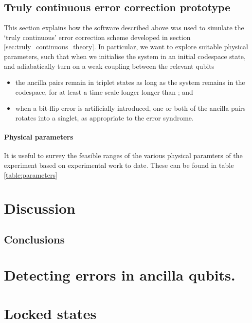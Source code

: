 \documentclass{report}
\begin{document}
\section{Truly continuous error correction prototype}
This section explains how the software described above was used to simulate the `truly continuous' error correction scheme developed in section \ref{sec:truly_continuous_theory}. In particular, we want to explore suitable physical parameters, such that when we initialise the system in an initial codespace state, and adiabatically turn on a weak coupling between the relevant qubits
\begin{itemize}
    \item the ancilla pairs remain in triplet states as long as the system remains in the codespace, for at least a time scale longer longer than ; and
    \item when a bit-flip error is artificially introduced, one or both of the ancilla pairs rotates into a singlet, as appropriate to the error syndrome.
\end{itemize}

\subsubsection{Physical parameters}
It is useful to survey the feasible ranges of the various physical paramters of the experiment based on experimental work to date. These can be found in table \ref{table:parameters}





\chapter {Discussion}

\section{Conclusions}

\printbibliography %

\begin{appendices}
\chapter{Detecting errors in ancilla qubits.}
\chapter{Locked states}
\end{appendices}
\end{document}
